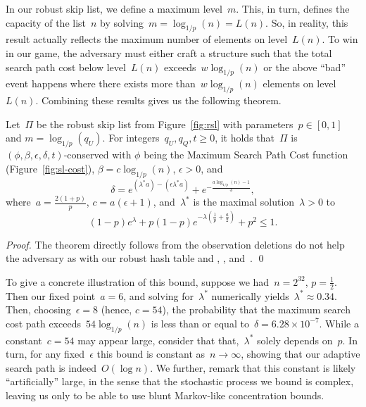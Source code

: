 In our robust skip list, we define a maximum level~$m$. This, in turn, defines the capacity of the list~$n$ by solving~$m = \log_{1/p}(n) = L(n)$. So, in reality, this result actually reflects the maximum number of elements on level~$L(n)$. To win in our game, the adversary must either craft a structure such that the total search path cost below level~$L(n)$ exceeds~$w \log_{1/p}(n)$ or the above ``bad'' event happens where there exists more than~$w \log_{1/p}(n)$ elements on level~$L(n)$. Combining these results gives us the following theorem.

\begin{theorem}\label{thm:rslsr}
    Let~$\Pi$ be the robust skip list from Figure~\ref{fig:rsl} with parameters~$p \in [0,1]$ and $m = \log_{1/p}(q_U)$. For integers~$q_U,q_Q,t \geq 0$, it holds that~$\Pi$ is~$(\phi,\beta,\epsilon,\delta,t)$-conserved with $\phi$ being the Maximum Search Path Cost function (Figure~\ref{fig:sl-cost}), $\beta = c \log_{1/p}(n)$, $\epsilon > 0 $, and 
    $$\delta = e^{(\lambda^{*}a) - (\epsilon\lambda^{*}a)} + e^{-\frac{a\log_{1/p}(n)-1}{3}},$$
    where~$a=\frac{2(1+p)}{p}$, $c = a(\epsilon + 1)$, and~$\lambda^{*}$ is the maximal solution~$\lambda > 0$ to
 $$(1-p)e^{\lambda} + p(1-p)e^{-\lambda \left(\frac{1}{p} + \frac{a}{2} \right)} + p^2 \leq 1 .$$
\end{theorem}

\begin{proof}
    The theorem directly follows from the observation deletions do not help the adversary as with our robust hash table and , , and~.
    \qed
\end{proof}

To give a concrete illustration of this bound, suppose we had~$n = 2^{32}$, $p=\frac{1}{2}$. Then our fixed point~$a = 6$, and solving for~$\lambda^{*}$ numerically yields~$\lambda^{*} \approx 0.34$. Then, choosing~$\epsilon = 8$ (hence, $c=54$), the probability that the maximum search cost path exceeds~$54 \log_{1/p}(n)$ is less than or equal to~$\delta =  6.28 \times 10^{-7}$. While a constant~$c = 54$ may appear large, consider that that,~$\lambda^{*}$ solely depends on~$p$. In turn, for any fixed~$\epsilon$ this bound is constant as~$n\to\infty$, showing that our adaptive search path is indeed~$O(\log n)$. We further, remark that this constant is likely ``artificially'' large, in the sense that the stochastic process we bound is complex, leaving us only to be able to use blunt Markov-like concentration bounds.

